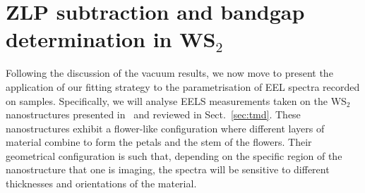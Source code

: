 \section{ZLP subtraction and bandgap determination in WS$_2$}
\label{sec:results_sample}

Following the discussion of the vacuum results, we now move
to present the application of our fitting strategy to the parametrisation
of EEL spectra recorded on samples.
%
Specifically, we will analyse EELS measurements taken on the WS$_2$ nanostructures
presented in~\cite{SabryaWS2} and reviewed in Sect.~\ref{sec:tmd}.
%
These nanostructures exhibit a flower-like configuration where different layers
of material combine to form the petals and the stem of the flowers.
%
Their geometrical configuration is such that, depending on the specific region
of the nanostructure that one is imaging, the spectra will be sensitive
to different thicknesses and orientations of the material.

